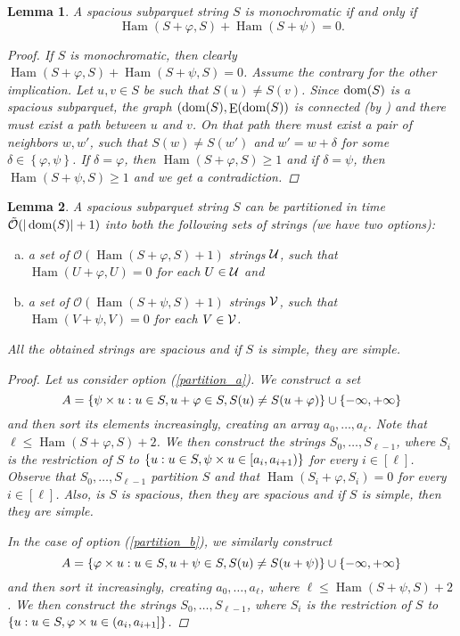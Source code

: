 \documentclass[11pt]{article}
\renewcommand{\O}{\mathcal{O}}
\newcommand{\tO}{\tilde{\mathcal{O}}}
\renewcommand{\phi}{\varphi}
\newcommand{\set}[1]{\left\lbrace #1 \right\rbrace}
\theoremstyle{plain}
\newtheorem{lemma}{Lemma}
\theoremstyle{definition}
\theoremstyle{remark}
\DeclareMathOperator*{\Edges}{E}
\DeclareMathOperator*{\Ham}{Ham}
\begin{document}
\begin{lemma}\label{monochromacy_condition}
	A spacious subparquet string $S$ is monochromatic if and only if
	$$\Ham(S + \phi, S) + \Ham(S + \psi) = 0.$$
	\begin{proof}
		If $S$ is monochromatic, then clearly $\Ham(S + \phi, S) + \Ham(S + \psi, S) = 0$.
		Assume the contrary for the other implication.
		Let $u, v \in S$ be such that $S(u) \neq S(v)$.
		Since $\operatorname*{dom}(S)$ is a spacious subparquet, the graph $(\d{S}, \Edges(\d{S})$ is connected (by ) and there must exist a path between $u$ and $v$.
		On that path there must exist a pair of neighbors $w, w'$, such that $S(w) \neq S(w')$ and $w' = w + \delta$ for some $\delta \in \set{\phi, \psi}$.
		If $\delta = \phi$, then $\Ham(S + \phi, S) \ge 1$ and if $\delta = \psi$, then $\Ham(S + \psi, S) \ge 1$ and we get a contradiction.
	\end{proof}
\end{lemma}


\begin{lemma}\label{cut_partitioning}
	A spacious subparquet string $S$ can be partitioned in time $\tO(|\d{S}| + 1)$ into both the following sets of strings (we have two options):
	\begin{enumerate}[a)]
		\item a set of $\O(\Ham(S + \phi, S) + 1)$ strings $\mathcal{U}$, such that $\Ham(U + \phi, U) = 0$ for each $U \in \mathcal{U}$ and \label{partition_a}
		\item a set of $\O(\Ham(S + \psi, S) + 1)$ strings $\mathcal{V}$, such that $\Ham(V + \psi, V) = 0$ for each $V \in \mathcal{V}$. \label{partition_b}
	\end{enumerate}
	All the obtained strings are spacious and if $S$ is simple, they are simple.
	\begin{proof}
		Let us consider option (\ref{partition_a}). We construct a set
		$$ A = \set{\s{u} : u \in S, u + \phi \in S, S(u) \neq S(u + \phi)} \cup \set{-\infty, +\infty}$$
		and then sort its elements increasingly, creating an array $a_0, \dots, a_\ell$.
		Note that $\ell \le \Ham(S + \phi, S) + 2$.
		We then construct the strings $S_0, \dots, S_{\ell - 1}$, where $S_i$ is the restriction of $S$ to
		$\set{u : u \in S, \s{u} \in [a_i, a_{i + 1})}$ for every $i \in [\ell]$.
		Observe that $S_0, \dots, S_{\ell - 1}$ partition $S$ and that $\Ham(S_i + \phi, S_i) = 0$ for every $i \in [\ell]$.
		Also, is $S$ is spacious, then they are spacious and if $S$ is simple, then they are simple.
	
		In the case of option (\ref{partition_b}), we similarly construct
		$$ A = \set{\h{u} : u \in S, u + \psi \in S, S(u) \neq S(u + \psi)} \cup \set{-\infty, +\infty} $$
		and then sort it increasingly, creating $a_0, \dots, a_\ell$, where $\ell \le \Ham(S + \psi, S) + 2$.
		We then construct the strings $S_0, \dots, S_{\ell - 1}$, where $S_i$ is the restriction of $S$ to 
		$\set{u : u \in S, \h{u} \in (a_i, a_{i + 1}]}$.
	\end{proof}
\end{lemma}
\end{document}
